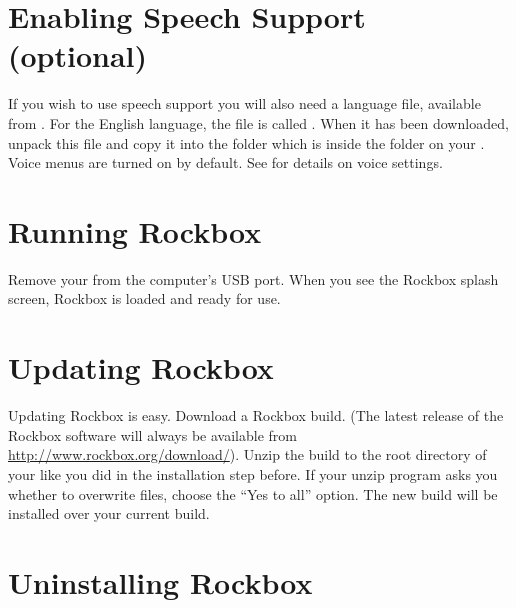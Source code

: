 \section{Enabling Speech Support (optional)}\label{sec:enabling_speech_support}
If you wish to use speech support you will also need a language file, available
from . For the English language, the file is called
. When it has been downloaded, unpack this file and copy
it into the  folder which is inside the  folder on
your \dap{}. Voice menus are turned on by default. See
 for details on voice settings.

\section{Running Rockbox}
Remove your \dap{} from the computer's USB port.%
%
%
When you see the Rockbox splash screen, Rockbox is loaded and ready for
use.


\section{Updating Rockbox} Updating Rockbox is easy. Download a Rockbox build.
(The latest release of the Rockbox software will always be available from
\url{http://www.rockbox.org/download/}). Unzip the build to the root directory
of your \dap{} like you did in the installation step before. If your unzip
program asks you whether to overwrite files, choose the ``Yes to all'' option.
The new build will be installed over your current build.

\section{Uninstalling Rockbox}

